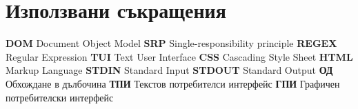 \chapter*{Използвани съкращения}

\noindent
\textbf{DOM} Document Object Model\newline
\textbf{SRP} Single-responsibility principle\newline
\textbf{REGEX} Regular Expression\newline
\textbf{TUI} Text User Interface\newline
\textbf{CSS} Cascading Style Sheet\newline
\textbf{HTML} Markup Language\newline
\textbf{STDIN} Standard Input\newline
\textbf{STDOUT} Standard Output\newline
\textbf{ОД} Обхождане в дълбочина\newline
\textbf{ТПИ} Текстов потребителси интерфейс\newline
\textbf{ГПИ} Графичен потребителски интерфейс\newline

